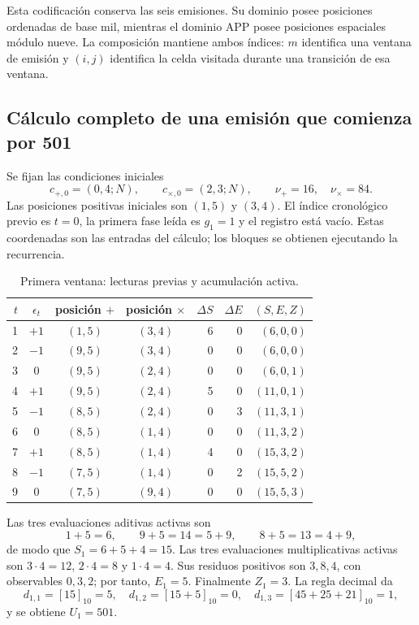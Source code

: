 Esta codificación conserva las seis emisiones. Su dominio posee posiciones
ordenadas de base mil, mientras el dominio APP posee posiciones espaciales
módulo nueve. La composición mantiene ambos índices: \(m\) identifica una
ventana de emisión y \((i,j)\) identifica la celda visitada durante una
transición de esa ventana.

\subsection{Cálculo completo de una emisión que comienza por 501}
\label{act21:tpk:ejemplo501}

Se fijan las condiciones iniciales
\[
 c_{+,0}=(0,4;N),\qquad c_{\times,0}=(2,3;N),
 \qquad \nu_+=16,\quad\nu_\times=84.
\]
Las posiciones positivas iniciales son \((1,5)\) y \((3,4)\). El índice
cronológico previo es \(t=0\), la primera fase leída es \(g_1=1\) y el
registro está vacío. Estas coordenadas son las entradas
del cálculo; los bloques se obtienen ejecutando la recurrencia.

\begin{table}[htbp]
\caption{Primera ventana: lecturas previas y acumulación activa.}
\label{act21:tpk:tabla-501}
\small
\begin{tabular}{@{}rcccrrr@{}}
\toprule
\(t\)&\(\epsilon_t\)&posición \(+\)&posición \(\times\)&
\(\Delta S\)&\(\Delta E\)&\((S,E,Z)\)\\
\midrule
1&\(+1\)&\((1,5)\)&\((3,4)\)&6&0&\((6,0,0)\)\\
2&\(-1\)&\((9,5)\)&\((3,4)\)&0&0&\((6,0,0)\)\\
3&0&\((9,5)\)&\((2,4)\)&0&0&\((6,0,1)\)\\
4&\(+1\)&\((9,5)\)&\((2,4)\)&5&0&\((11,0,1)\)\\
5&\(-1\)&\((8,5)\)&\((2,4)\)&0&3&\((11,3,1)\)\\
6&0&\((8,5)\)&\((1,4)\)&0&0&\((11,3,2)\)\\
7&\(+1\)&\((8,5)\)&\((1,4)\)&4&0&\((15,3,2)\)\\
8&\(-1\)&\((7,5)\)&\((1,4)\)&0&2&\((15,5,2)\)\\
9&0&\((7,5)\)&\((9,4)\)&0&0&\((15,5,3)\)\\
\bottomrule
\end{tabular}
\end{table}

Las tres evaluaciones aditivas activas son
\[
 1+5=6,\qquad9+5=14=5+9,\qquad8+5=13=4+9,
\]
de modo que \(S_1=6+5+4=15\). Las tres evaluaciones multiplicativas activas
son \(3\cdot4=12\), \(2\cdot4=8\) y \(1\cdot4=4\). Sus residuos
positivos son \(3,8,4\), con observables \(0,3,2\); por tanto,
\(E_1=5\). Finalmente \(Z_1=3\). La regla decimal da
\[
 d_{1,1}=[15]_{10}=5,\quad
 d_{1,2}=[15+5]_{10}=0,\quad
 d_{1,3}=[45+25+21]_{10}=1,
\]
y se obtiene \(U_1=501\).

